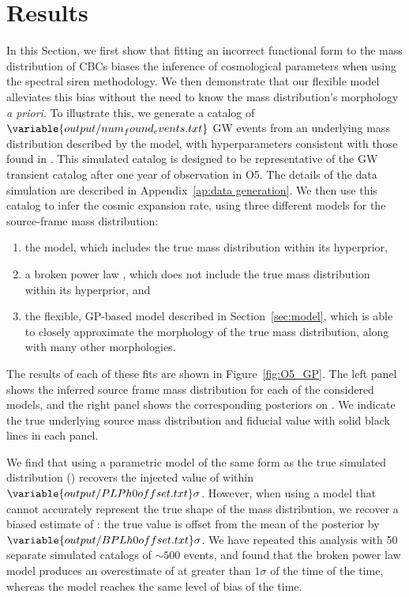 \documentclass[]{aastex631}
\begin{document}
\section{Results}
\label{sec:results}
In this Section, we first show that fitting an incorrect functional form to the mass distribution of \acp{CBC} biases the inference of cosmological parameters when using the spectral siren methodology.
We then demonstrate that our flexible model alleviates this bias without the need to know the mass distribution's morphology \emph{a priori}.
To illustrate this, we generate a catalog of $\variable{output/num_found_events.txt}$ \ac{GW} events from an underlying mass distribution described by the \plp{} model, with hyperparameters consistent with those found in \citet{abbott_population_2023}.
This simulated catalog is designed to be representative of the \ac{GW}  transient catalog after one year of observation in \ac{O5}.
The details of the data simulation are described in Appendix~\ref{ap:data generation}.
We then use this catalog to infer the cosmic expansion rate, using three different models for the source-frame mass distribution:
\begin{enumerate}
    \item the \plp{} model, which includes the true mass distribution within its hyperprior,
    \item a broken power law , which does not include the true mass distribution within its hyperprior, and 
    \item the flexible, \ac{GP}-based model described in Section~\ref{sec:model}, which is able to closely approximate the morphology of the true mass distribution, along with many other morphologies.
\end{enumerate}
The results of each of these fits are shown in Figure~\ref{fig:O5_GP}. 
The left panel shows the inferred source frame mass distribution for each of the considered models, and the right panel shows the corresponding posteriors on \Ho{}. 
We indicate the true underlying source mass distribution and fiducial \Ho{} value with solid black lines in each panel. 

We find that using a parametric model of the same form as the true simulated distribution (\plp) recovers the injected value of \Ho{} within $\variable{output/PLPh0offset.txt}\sigma$.
However, when using a model that cannot accurately represent the true shape of the mass distribution, we recover a biased estimate of \Ho: the true value is offset from the mean of the posterior by $\variable{output/BPLh0offset.txt}\sigma$.
We have repeated this analysis with 50 separate simulated catalogs of $\sim500$ events, and found that the broken power law model produces an overestimate of \Ho{} at greater than $1\sigma$ %
of the time of the time, whereas %
the \plp{} model reaches the same level of bias %
of the time.
\end{document}

